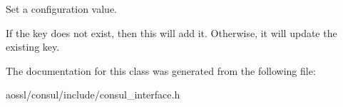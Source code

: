 Set a configuration value. 

If the key does not exist, then this will add it. Otherwise, it will update the existing key. 

The documentation for this class was generated from the following file\+:\begin{DoxyCompactItemize}
\item 
aossl/consul/include/consul\+\_\+interface.\+h\end{DoxyCompactItemize}
